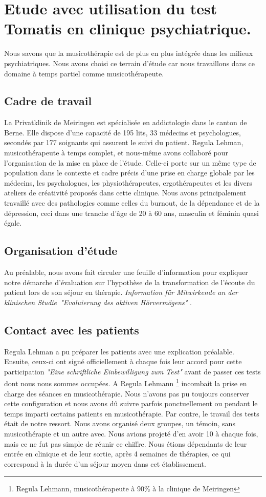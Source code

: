 \chapter{Etude avec utilisation du test Tomatis en clinique psychiatrique.}
Nous savons que la musicothérapie est de plus en plus intégrée dans
les milieux psychiatriques. Nous avons choisi ce terrain d'étude car 
nous  travaillons dans ce domaine  à temps partiel comme musicothérapeute.
\section{Cadre de travail}
 La Privatklinik
de Meiringen est  spécialisée en
addictologie dans le canton de Berne. Elle dispose d'une capacité de 195 lits, 33 médecins et
psychologues, secondés par 177 soignants qui assurent le suivi du
patient. Regula Lehman, musicothérapeute à temps complet, et nous-même avons
collaboré  pour l'organisation de la mise en place de l'étude. Celle-ci porte sur un même type de
population dans le contexte et cadre  précis d'une prise en charge globale
par les médecins, les psychologues, les physiothérapeutes,
ergothérapeutes et les divers ateliers de créativité proposés dans
cette clinique. Nous avons principalement travaillé avec des
pathologies comme celles du burnout, de la dépendance et de la
dépression, ceci dans une tranche d'âge de 20 à 60 ans, masculin et
féminin quasi égale. 
\section{Organisation d'étude}
Au préalable, nous avons fait circuler une
feuille d'information pour expliquer notre démarche d'évaluation sur
l'hypothèse de la transformation de l'écoute du patient lors de son
séjour en thérapie. \emph{Information für Mitwirkende an der klinischen
Studie\  "Evaluierung des aktiven Hörvermögens" }. 
 
 \section{Contact avec les patients}
 
 Regula Lehman a pu
préparer  les patients avec une explication préalable. Ensuite,
ceux-ci ont signé officiellement à chaque fois leur
accord pour cette participation  \emph{"Eine schriftliche Einbewilligung zum
Test"} avant de passer ces tests dont nous nous sommes occupées.
A Regula Lehmann  \footnote{Regula
  Lehmann, musicothérapeute  à 90\%  à la clinique de Meiringen} incombait la
prise en charge des séances en musicothérapie. Nous n'avons pas pu
toujours conserver cette configuration et nous avons dû suivre parfois
ponctuellement ou pendant le temps imparti certains patients en
musicothérapie. Par contre, le travail des tests était de notre ressort.  Nous avons organisé deux groupes, un témoin, sans
musicothérapie et un autre avec. Nous avions projeté d'en avoir
10 à chaque fois, mais ce ne fut pas simple de réunir ce
chiffre. Nous étions dépendants de leur entrée en clinique et de leur
sortie, après 4 semaines de thérapies, ce qui correspond à la durée
d'un séjour moyen dans cet établissement.


